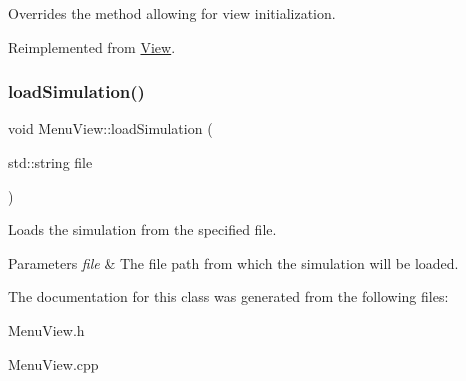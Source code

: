 Overrides the method allowing for view initialization. 



Reimplemented from \mbox{\hyperlink{class_view_a334fa9a19d2faca0120ef2869c3dd8ad}{View}}.

\mbox{\label{class_menu_view_a12f1c4322b521568524ba0abdb854a96}} 
\subsubsection{\texorpdfstring{loadSimulation()}{loadSimulation()}}
{\footnotesize\ttfamily void Menu\+View\+::load\+Simulation (\begin{DoxyParamCaption}\item[{std\+::string}]{file }\end{DoxyParamCaption})}



Loads the simulation from the specified file. 


\begin{DoxyParams}{Parameters}
{\em file} & The file path from which the simulation will be loaded.\\
\hline
\end{DoxyParams}


The documentation for this class was generated from the following files\+:\begin{DoxyCompactItemize}
\item 
Menu\+View.\+h\item 
Menu\+View.\+cpp\end{DoxyCompactItemize}

